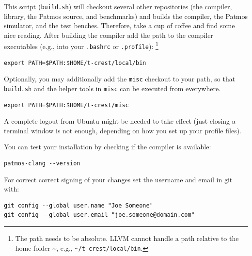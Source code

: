 \documentclass[a4paper,fontsize=10pt,twoside,DIV15,BCOR12mm,headinclude=true,footinclude=false,pagesize,bibtotoc]{scrbook}
\newcommand{\code}[1]{{\texttt{#1}}}
\newcommand{\comment}[3]{

\textsf{\textbf{#1}} {\color{#3}#2}}
\newcommand{\martin}[1]{\comment{Martin}{#1}{Blue}}
\newcommand{\stefan}[1]{\comment{Stefan}{#1}{RoyalPurple}}
\renewcommand{\martin}[1]{}
\renewcommand{\stefan}[1]{}
\begin{document}
This script (\code{build.sh}) will checkout several other repositories (the compiler, library,
the Patmos source, and benchmarks) and
builds the compiler, the Patmos simulator, and the test benches.
Therefore, take a cup of coffee and find some nice reading.
After building the compiler add the path
to the compiler executables (e.g., into your \code{.bashrc} or \code{.profile}):
\footnote{The path needs to be absolute. LLVM cannot handle
a path relative to the home folder \textasciitilde{}, e.g., \code{\textasciitilde{}/t-crest/local/bin}.}

\martin{In Mac OS X I have only .profile and I don't understand what the issue by 'only read by login terminals'.}

\stefan{Relative paths should actually work, but the \textasciitilde{} shortcut is shell-specific and may not work, but
not sure about this.}

\begin{verbatim}
export PATH=$PATH:$HOME/t-crest/local/bin
\end{verbatim}

Optionally, you may additionally add the \code{misc} checkout to your path, so that \code{build.sh} and the helper tools in 
\code{misc} can be executed from everywhere.

\begin{verbatim}
export PATH=$PATH:$HOME/t-crest/misc
\end{verbatim}

A complete logout from Ubuntu might be needed to take effect (just closing
a terminal window is not enough, depending on how you set up your profile files).

You can test your installation by checking if the compiler is available:

\begin{verbatim}
patmos-clang --version
\end{verbatim}

For correct correct signing of your changes set the username and
email in git with:

\begin{verbatim}
git config --global user.name "Joe Someone"
git config --global user.email "joe.someone@domain.com"
\end{verbatim}
\end{document}
